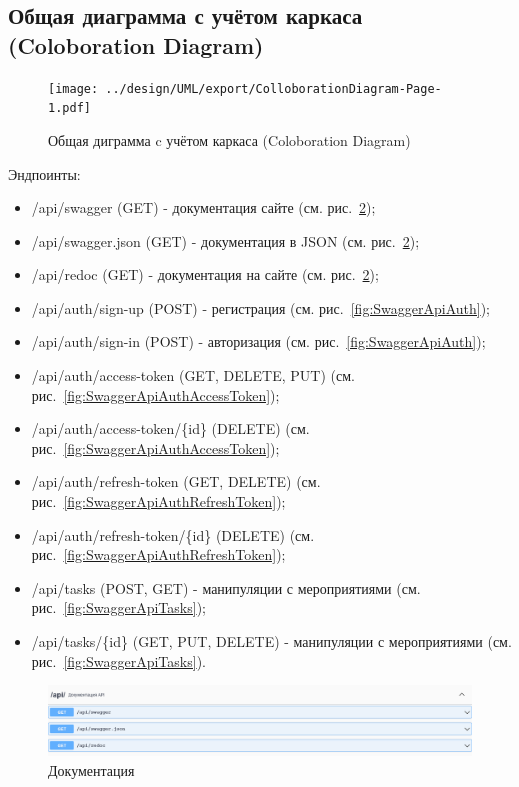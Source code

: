\newpage
\subsection{Общая диаграмма с учётом каркаса (Coloboration Diagram)}

\begin{figure}[!h]
  \centering

  \texttt{[image: ../design/UML/export/ColloborationDiagram-Page-1.pdf]}

  \caption{Общая диграмма c учётом каркаса (Coloboration Diagram)}
  \label{fig:ColloborationDiagram}
\end{figure}

Эндпоинты:

\begin{itemize}
  \item /api/swagger (GET) - документация сайте (см. рис.~\ref{fig:SwaggerApi});
  \item /api/swagger.json (GET) - документация в JSON (см. рис.~\ref{fig:SwaggerApi});
  \item /api/redoc (GET) - документация на сайте (см. рис.~\ref{fig:SwaggerApi});

  \item /api/auth/sign-up (POST) - регистрация (см. рис.~\ref{fig:SwaggerApiAuth});
  \item /api/auth/sign-in (POST) - авторизация (см. рис.~\ref{fig:SwaggerApiAuth});

  \item /api/auth/access-token (GET, DELETE, PUT) (см. рис.~\ref{fig:SwaggerApiAuthAccessToken});
  \item /api/auth/access-token/\{id\} (DELETE) (см. рис.~\ref{fig:SwaggerApiAuthAccessToken});

  \item /api/auth/refresh-token (GET, DELETE) (см. рис.~\ref{fig:SwaggerApiAuthRefreshToken});
  \item /api/auth/refresh-token/\{id\} (DELETE) (см. рис.~\ref{fig:SwaggerApiAuthRefreshToken});

  \item /api/tasks (POST, GET) - манипуляции с мероприятиями (см. рис.~\ref{fig:SwaggerApiTasks});
  \item /api/tasks/\{id\} (GET, PUT, DELETE) - манипуляции с мероприятиями (см. рис.~\ref{fig:SwaggerApiTasks}).
\end{itemize}

\begin{figure}[!p]
  \centering

  \includegraphics[width=18cm]
  {images/api.png}

  \caption{Документация}
  \label{fig:SwaggerApi}
\end{figure}

